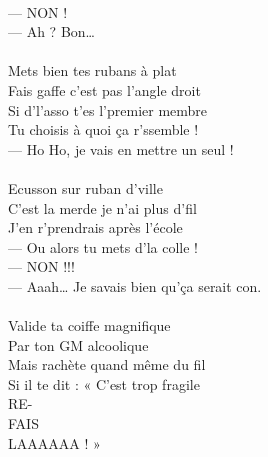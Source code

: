 \\— NON !
\\— Ah ? Bon…
\\\\Mets bien tes rubans à plat
\\Fais gaffe c’est pas l’angle droit
\\Si d’l’asso t’es l’premier membre
\\Tu choisis à quoi ça r’ssemble !
\\— Ho Ho, je vais en mettre un seul !
\\\\Ecusson sur ruban d’ville
\\C’est la merde je n’ai plus d’fil
\\J’en r’prendrais après l’école
\\— Ou alors tu mets d’la colle !
\\— NON !!!
\\— Aaah… Je savais bien qu’ça serait con.
\\\\Valide ta coiffe magnifique
\\Par ton GM alcoolique
\\Mais rachète quand même du fil
\\Si il te dit : « C'est trop fragile
\\RE-
\\FAIS
\\LAAAAAA ! » 

\breakpage